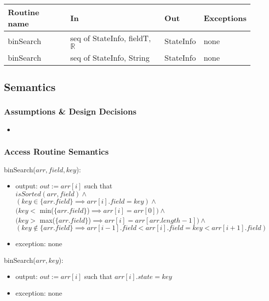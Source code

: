 \documentclass[12pt]{article}
\begin{document}
\begin{tabular}{| l | l | l | p{5cm} |}
\hline
\textbf{Routine name} & \textbf{In} & \textbf{Out} & \textbf{Exceptions}\\
\hline
binSearch &  seq of StateInfo, fieldT, $\mathbb{R}$ &  StateInfo & none\\
\hline
binSearch &  seq of StateInfo, String &  StateInfo & none\\
\hline
\end{tabular}

\subsection* {Semantics}

\subsubsection* {Assumptions \& Design Decisions}

\begin{itemize}
\item 
\end{itemize}

\subsubsection* {Access Routine Semantics}

binSearch($arr, field, key$):
\begin{itemize}
\item output: $\mathit{out} := arr[i]$ such that\\
\indent
$isSorted(arr, field) \land $\\ 
$(key \in \{arr.field\} \implies arr[i].field = key) \land$\\
$(key <$ min($\{arr.field\}$)$ \implies arr[i] = arr[0]) \land$\\
$(key >$ max($\{arr.field\}$)$ \implies arr[i] = arr[arr.length-1]) \land$\\
$(key \notin \{arr.field\} \implies arr[i-1].field < arr[i].field = key < arr[i+1].field)$
\item exception: none
\end{itemize}

\noindent
binSearch($arr, key$):
\begin{itemize}
\item output: $\mathit{out} := arr[i]$ such that $arr[i].state = key$
\item exception: none
\end{itemize}
\end{document}
